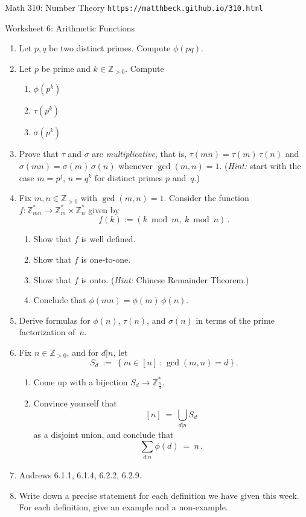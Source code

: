 \documentclass[11pt]{article}
\def\Z{\mathbb{Z}}
\begin{document}
\setlength{\parindent}{0pt}
\setlength{\parskip}{0.2cm}

{ Math 310: Number Theory} \hfill {\tt https://matthbeck.github.io/310.html}

\vspace{.3in}

\begin{center}
\Large{Worksheet 6: Arithmetic Functions}
\end{center}

\begin{enumerate}

\item Let $p, q$ be two distinct primes. Compute $\phi(pq)$.

\item Let $p$ be prime and $k \in \Z_{ >0 }$. Compute
\begin{enumerate}
  \item $\phi(p^k)$
  \item $\tau(p^k)$
  \item $\sigma(p^k)$
\end{enumerate} 

\item Prove that $\tau$ and $\sigma$ are \emph{multiplicative}, that is, $\tau(mn) = \tau(m) \, \tau(n)$ and
$\sigma(mn) = \sigma(m) \, \sigma(n)$ whenever $\gcd(m,n) = 1$.
(\emph{Hint:} start with the case $m = p^j$, $n = q^k$ for distinct primes $p$ and~$q$.)

\item Fix $m, n \in \Z_{ >0 }$ with $\gcd(m,n) = 1$.
Consider the function $f: \Z_{ mn }^* \to \Z_m^* \times \Z_n^*$ given by
\[
  f(k) := (k \bmod m, \ k \bmod n) \, .
\]
\begin{enumerate}
  \item Show that $f$ is well defined.
  \item Show that $f$ is one-to-one.
  \item Show that $f$ is onto. (\emph{Hint:} Chinese Remainder Theorem.)
  \item Conclude that $\phi(mn) = \phi(m) \, \phi(n)$.
\end{enumerate} 

\item Derive formulas for $\phi(n)$, $\tau(n)$, and $\sigma(n)$ in terms of the prime factorization of~$n$.

\item Fix $n \in \Z_{ >0 }$, and for $d|n$, let
\[
  S_d \ := \ \left\{ m \in [n] \, : \, \gcd(m,n) = d \right\} .
\]
\begin{enumerate}
  \item Come up with a bijection $S_d \to \Z_{ \frac n d }^*$.
  \item Convince yourself that
  \[
    [n] \ = \ \bigcup_{ d|n } S_d
  \]
  as a disjoint union, and conclude that
  \[
    \sum_{ d|n } \phi(d) \ = \ n \, .
  \]
\end{enumerate} 

\item Andrews 6.1.1, 6.1.4, 6.2.2, 6.2.9.
 
\item Write down a precise statement for each definition we have given this week.
For each definition, give an example and a non-example.

\end{enumerate}
\end{document}
